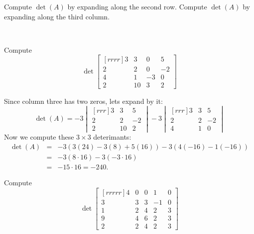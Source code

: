 \bb
\ii Compute $\det(A)$ by expanding along the second row. 
\ii Compute $\det(A)$ by expanding along the third column. 
\ee
\begin{solution} 
\ \\
\end{solution}
\ii Compute 
$$
\det 
\begin{bmatrix}[rrrr]
3&3&0&5\\
2&2&0&-2\\
4&1&-3&0\\
2&10&3&2
\end{bmatrix}
$$
\begin{solution}
Since column three has two zeros, lets expand by it:\\
$$\det(A) = -3
\begin{vmatrix}[rrr]
3&3&5\\
2&2&-2\\
2&10&2
\end{vmatrix}
-3
\begin{vmatrix}[rrr]
3&3&5\\
2&2&-2\\
4&1&0
\end{vmatrix}
$$
Now we compute these $3\times 3$ deterimants:
\begin{eqnarray*}
\det(A) &=&-3(3(24)-3(8)+5(16))-3(4(-16)-1(-16))\\
&=&-3(8\cdot 16)-3(-3\cdot 16)\\
&=&-15\cdot 16=-240.
\end{eqnarray*}
\end{solution}
\ii Compute 
$$ \det  
\begin{bmatrix}[rrrrr]
4&0&0&1&0\\
3&3&3&-1&0\\
1&2&4&2&3\\
9&4&6&2&3\\
2&2&4&2&3
\end{bmatrix}
$$
